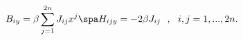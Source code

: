 \begin{equation}
\label{NSNSfields}
B_{iy} = \beta \sum_{j=1}^{2n} J_{ij} x^j
\spa
H_{ijy} = - 2\beta J_{ij}
\ \ , \ \ i,j=1,...,2n.
\end{equation}


